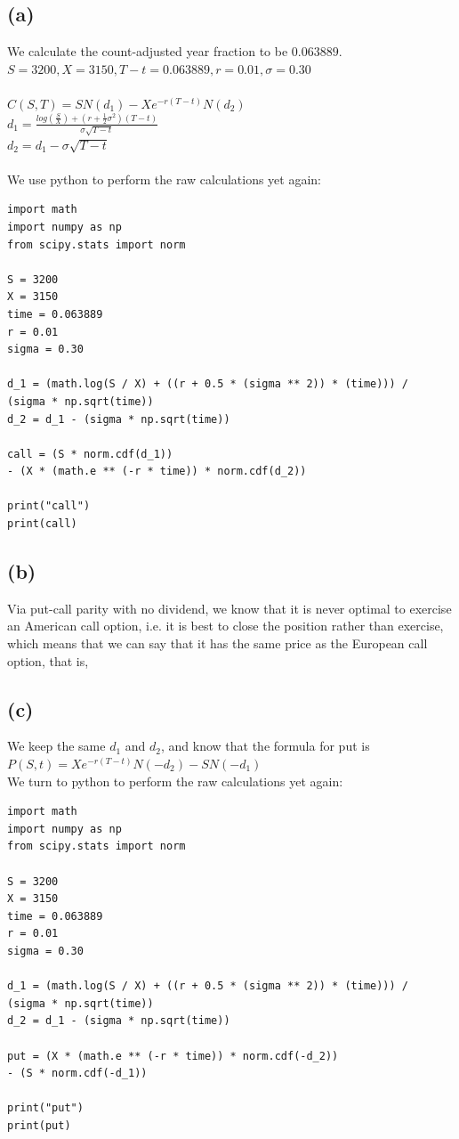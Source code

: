 \documentclass{article}
\begin{document}
{\Large 

\subsection*{(a)}

We calculate the count-adjusted year fraction to be $0.063889$. \\
$S = 3200, X = 3150, T-t = 0.063889, r = 0.01, \sigma = 0.30$ \\ \\
$C(S, T) = SN(d_1) - Xe^{-r(T-t)}N(d_2)$ \\
$d_1 = \frac{log(\frac{S}{X}) + (r+\frac{1}{2}\sigma^2)(T-t)}{\sigma\sqrt{T-t}}$ \\
$d_2 = d_1 - \sigma\sqrt{T-t}$ \\ \\
We use python to perform the raw calculations yet again:
\begin{verbatim}
import math
import numpy as np
from scipy.stats import norm

S = 3200
X = 3150
time = 0.063889
r = 0.01
sigma = 0.30

d_1 = (math.log(S / X) + ((r + 0.5 * (sigma ** 2)) * (time))) / 
(sigma * np.sqrt(time))
d_2 = d_1 - (sigma * np.sqrt(time))

call = (S * norm.cdf(d_1)) 
- (X * (math.e ** (-r * time)) * norm.cdf(d_2))

print("call")
print(call)
\end{verbatim}

\subsection*{(b)}

Via put-call parity with no dividend, we know that it is never optimal to exercise an American call option, i.e. it is best to close the position rather than exercise, which means that we can say that it has the same price as the European call option, that is, 

\subsection*{(c)}

We keep the same $d_1$ and $d_2$, and know that the formula for put is $P(S, t) = Xe^{-r(T - t)}N(-d_2) - SN(-d_1)$ \\
We turn to python to perform the raw calculations yet again:
\begin{verbatim}
import math
import numpy as np
from scipy.stats import norm

S = 3200
X = 3150
time = 0.063889
r = 0.01
sigma = 0.30

d_1 = (math.log(S / X) + ((r + 0.5 * (sigma ** 2)) * (time))) / 
(sigma * np.sqrt(time))
d_2 = d_1 - (sigma * np.sqrt(time))

put = (X * (math.e ** (-r * time)) * norm.cdf(-d_2)) 
- (S * norm.cdf(-d_1))

print("put")
print(put)
\end{verbatim}
\newpage
}
\end{document}
